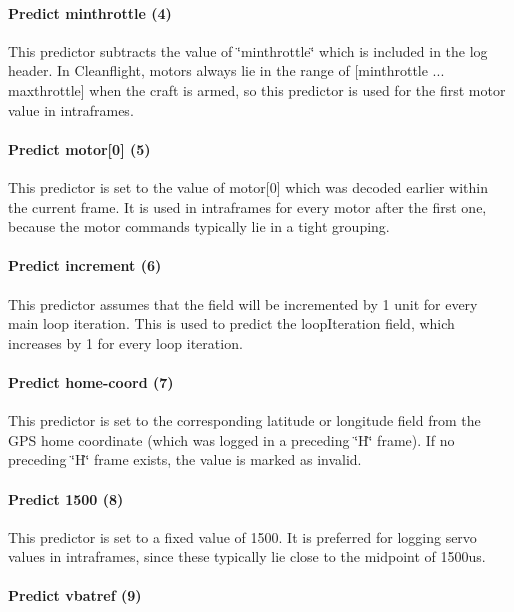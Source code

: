 \paragraph*{Predict minthrottle (4)}

This predictor subtracts the value of \char`\"{}minthrottle\char`\"{} which is included in the log header. In Cleanflight, motors always lie in the range of {\ttfamily \mbox{[}minthrottle ... maxthrottle\mbox{]}} when the craft is armed, so this predictor is used for the first motor value in intraframes.

\paragraph*{Predict motor\mbox{[}0\mbox{]} (5)}

This predictor is set to the value of {\ttfamily motor\mbox{[}0\mbox{]}} which was decoded earlier within the current frame. It is used in intraframes for every motor after the first one, because the motor commands typically lie in a tight grouping.

\paragraph*{Predict increment (6)}

This predictor assumes that the field will be incremented by 1 unit for every main loop iteration. This is used to predict the {\ttfamily loop\+Iteration} field, which increases by 1 for every loop iteration.

\paragraph*{Predict home-\/coord (7)}

This predictor is set to the corresponding latitude or longitude field from the G\+P\+S home coordinate (which was logged in a preceding \char`\"{}\+H\char`\"{} frame). If no preceding \char`\"{}\+H\char`\"{} frame exists, the value is marked as invalid.

\paragraph*{Predict 1500 (8)}

This predictor is set to a fixed value of 1500. It is preferred for logging servo values in intraframes, since these typically lie close to the midpoint of 1500us.

\paragraph*{Predict vbatref (9)}

